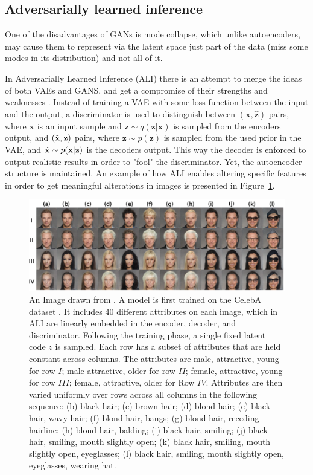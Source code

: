 \documentclass[graybox]{svmult}
\newcommand{\mb}[1]{\mathbf{#1}}
\newcommand{\bx}[0]{\mb{x}}
\newcommand{\bz}[0]{\mb{z}}
\begin{document}
\subsection{Adversarially learned inference}
\label{sec:ALI}

One of the disadvantages of GANs is mode collapse, which unlike autoencoders, may cause them to represent via the latent space just part of the data (miss some modes in its distribution) and not all of it.  

In Adversarially Learned Inference (ALI) there is an attempt to merge the ideas of both VAEs and GANS, and get a compromise of their strengths and weaknesses \cite{ALI}. Instead of training a VAE with some loss function between the input and the output, a discriminator is used to distinguish between $(\bx,\hat{\bz})$ pairs, where $\bx$ is an input sample and $\bz\sim q(\bz|\bx)$ is sampled from the encoders output, and $(\Tilde{\bx},\bz)$ pairs, where $\bz\sim p(\bz)$ is sampled from the used prior in the VAE, and $\Tilde{\bx}\sim p(\bx|\bz)$
is the decoders output.
This way the decoder is enforced to output realistic results in order to "fool" the discriminator. Yet, the autoencoder structure is maintained. An example of how ALI enables altering specific features in order to get meaningful alterations in images is presented in Figure~\ref{fig:ALI}.

\begin{figure}
    \centering
    \includegraphics[scale=0.35]{ali.png}
    \caption{An Image drawn from \cite{ALI}. A model is first trained on the CelebA dataset \cite{CelebA}. It includes 40 different attributes on each image, which in ALI are linearly embedded in the encoder, decoder, and discriminator. Following the training phase, a single fixed latent code $z$ is sampled. Each row has a subset of attributes that are held constant across columns. The attributes are male, attractive, young for row $I$; male attractive, older for row $II$; female, attractive, young for row $III$; female, attractive, older for Row $IV$. Attributes are then varied uniformly over rows across all columns in the following sequence: (b) black hair; (c) brown hair; (d) blond hair; (e) black hair, wavy hair; (f) blond hair, bangs; (g) blond hair, receding hairline; (h) blond hair, balding; (i) black hair, smiling; (j) black hair, smiling, mouth slightly open; (k) black hair, smiling, mouth slightly open, eyeglasses; (l) black hair, smiling, mouth slightly open, eyeglasses, wearing hat.}
    \label{fig:ALI}
\end{figure}
\end{document}
